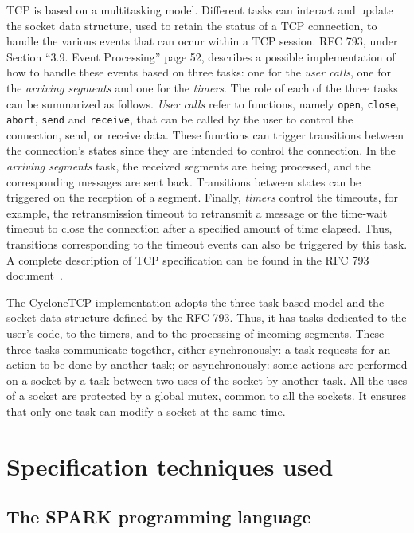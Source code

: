 \documentclass[conference]{IEEEtran}
\begin{document}
TCP is based on a multitasking model. Different tasks can interact and update the socket data structure, used to retain the status of a TCP connection, to handle the various events that can occur within a TCP session. RFC 793, under Section ``3.9. Event Processing'' page 52, describes a possible implementation of how to handle these events based on three tasks: one for the \emph{user calls}, one for the \emph{arriving segments} and one for the \emph{timers}. The role of each of the three tasks can be summarized as follows. \textit{User calls} refer to functions, namely \texttt{open}, \texttt{close}, \texttt{abort}, \texttt{send} and \texttt{receive}, that can be called by the user to control the connection, send, or receive data. These functions can trigger transitions between the connection's states since they are intended to control the connection. In the \textit{arriving segments} task, the received segments are being processed,
and the corresponding messages are sent back. Transitions between states can be triggered on the reception of a segment. Finally, \textit{timers} control the timeouts, for example, the retransmission timeout to retransmit a message or the time-wait timeout to close the connection after a specified amount of time elapsed. Thus, transitions corresponding to the timeout events can also be triggered by this task. A complete description of TCP specification can be found in the RFC 793 document~\cite{rfc793}.

The CycloneTCP implementation adopts the three-task-based model and the socket data structure defined by the RFC 793. Thus, it has tasks dedicated to the user's code, to the timers, and to the processing of incoming segments. These  three tasks communicate together, either synchronously: a task requests for an action to be done by another task; or asynchronously: some actions are performed on a socket by a task between two uses of the socket by another task. All the uses of a socket are protected by a global mutex, common to all the sockets. It ensures that only one task can modify a socket at the same time.

\section{Specification techniques used}
\label{sec:spec}

\subsection{The SPARK programming language}
\end{document}
